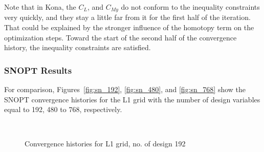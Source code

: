 Note that in Kona, the $C_L$, and $C_{My}$ do not conform to the inequality constraints very quickly, and they 
stay a little far from it for the first half of the iteration. That could be explained by the stronger influence of the homotopy term on the optimization steps. Toward the start of the second half of the convergence history, the inequality constraints are satisfied.   

\subsubsection{SNOPT Results}
For comparison, Figures~\ref{fig:sn_192}, \ref{fig:sn_480}, and \ref{fig:sn_768} show the SNOPT convergence histories  for the L1 grid with the number of 
design variables equal to 192, 480 to 768, respectively. 

\begin{figure}[H]
  \centering
     \\
   \caption{Convergence histories for L1 grid, no. of design 192 \label{fig:kona_192}}
\end{figure}

